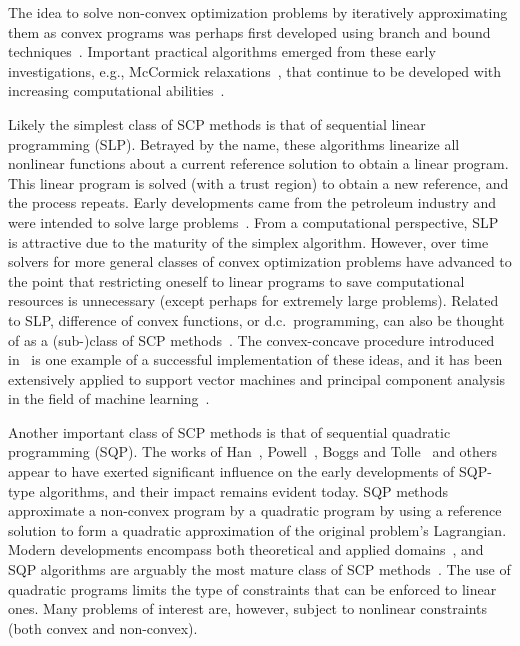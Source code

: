 \documentclass[letterpaper, 10 pt, conference]{ieeeconf}
\begin{document}
The idea to solve non-convex optimization problems by iteratively approximating them as convex programs was perhaps first developed using branch and bound techniques~\cite{Falk1969,Soland1971,Horst1984}. Important practical algorithms emerged from these early investigations, e.g., McCormick relaxations~\cite{McCormick1976}, that continue to be developed with increasing computational abilities~\cite{Mitsos2009,Tsoukalas2014,Singer2004}.

Likely the simplest class of SCP methods is that of sequential linear programming (SLP). Betrayed by the name, these algorithms linearize all nonlinear functions about a current reference solution to obtain a linear program. This linear program is solved (with a trust region) to obtain a new reference, and the process repeats. Early developments came from the petroleum industry and were intended to solve large problems~\cite{Palacios-Gomez1982,Byrd2004}. From a computational perspective, SLP is attractive due to the maturity of the simplex algorithm. However, over time solvers for more general classes of convex optimization problems have advanced to the point that restricting oneself to linear programs to save computational resources is unnecessary (except perhaps for extremely large problems).  Related to SLP, difference of convex functions, or d.c.~programming, can also be thought of as a (sub-)class of SCP methods~\cite{Horst1999}. The convex-concave procedure introduced in~\cite{Yuille2002} is one example of a successful implementation of these ideas, and it has been extensively applied to support vector machines and principal component analysis in the field of machine learning~\cite{Lanckriet2009}. 

Another important class of SCP methods is that of sequential quadratic programming (SQP). The works of Han~\cite{Han1977}, Powell~\cite{Powell1978a,Powell1986}, Boggs and Tolle~\cite{Boggs1982,Boggs1989,Boggs1996} and others~\cite{Fukushima1986} appear to have exerted significant influence on the early developments of SQP-type algorithms, and their impact remains evident today. SQP methods approximate a non-convex program by a quadratic program by using a reference solution to form a quadratic approximation of the original problem's Lagrangian. Modern developments encompass both theoretical and applied domains~\cite{Betts1993,Lawrence2003}, and SQP algorithms are arguably the most mature class of SCP methods~\cite{Gill2005}. The use of quadratic programs limits the type of constraints that can be enforced to linear ones. Many problems of interest are, however, subject to nonlinear constraints (both convex and non-convex).  
\end{document}
